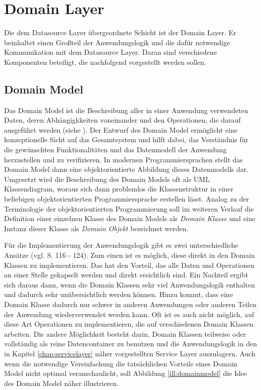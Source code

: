\pagebreak
\section{Domain Layer}
Die dem Datasource Layer übergeordnete Schicht ist der Domain Layer. Er
beinhaltet einen Großteil der Anwendungslogik und die dafür notwendige
Kommunikation mit dem Datasource Layer. Daran sind verschiedene Komponenten
beteiligt, die nachfolgend vorgestellt werden sollen.

\subsection{Domain Model}\label{sec:domainmodel}
Das Domain Model ist die Beschreibung aller in einer Anwendung verwendeten Daten,
deren Abhängigkkeiten voneinander und den Operationen, die darauf ausgeführt
werden (siehe \cite{stoyanova:2006}). Der Entwurf des Domain Model ermöglicht
eine konzeptionelle Sicht auf das Gesamtsystem und hilft dabei, das Verständnis
für die gewünschten Funktionalitäten und das Datenmodell der Anwendung herzustellen und
zu verifizieren. In modernen Programmiersprachen stellt das Domain Model dann
eine objektorientierte Abbildung dieses Datenmodells dar. Umgesetzt wird die
Beschreibung des Domain Models oft als \ac{UML} Klassendiagram, woraus sich dann
problemlos die Klassenstruktur in einer beliebigen objektorientierten
Programmiersprache erstellen lässt. Analog zu der Terminologie der
objektorientierten Programmierung soll im weiteren Verlauf die Definition einer
einzelnen Klasse des Domain Models als \emph{Domain Klasse} und eine Instanz
dieser Klasse als \emph{Domain Objekt} bezeichnet werden.

Für die Implementierung der Anwendungslogik gibt es zwei unterschiedliche Ansätze
(vgl. \cite{fowler:2002} S. 116 - 124). Zum einen ist es möglich, diese direkt
in den Domain Klassen zu implementieren. Das hat den Vorteil, das alle Daten und
Operationen an einer Stelle gekapselt werden und direkt ersichtlich sind. Ein
Nachteil ergibt sich daraus dann, wenn die Domain Klassen sehr viel
Anwendungslogik enthalten und dadurch sehr unübersichtlich werden können. Hinzu
kommt, dass eine Domain Klasse dadurch nur schwer in anderen Anwendungen oder anderen Teilen
der Anwendung wiederverwendet werden kann. Oft ist es auch nicht möglich, auf
diese Art Operationen zu implementieren, die auf verschiedenen Domain Klassen
arbeiten. Die andere Möglichkeit besteht darin, Domain Klassen teilweise oder
vollständig als reine Datencontainer zu benutzen und die Anwendungslogik in den
in Kapitel \ref{chap:servicelayer} näher vorgestellten Service Layer auszulagern.
Auch wenn die notwendige Vereinfachung die tatsächlichen Vorteile eines Domain
Model nicht optimal veranschaulicht, soll Abbildung \ref{ill:domainmodel} die
Idee des Domain Model näher illustrieren.

